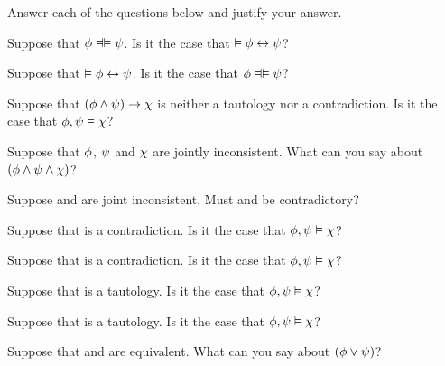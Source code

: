 \problempart
Answer each of the questions below and justify your answer.
\begin{earg}

\item Suppose that $\meta{\phi} \lequiv \meta{\psi}$.  Is it the case that $\vDash \mathcal{\phi} \leftrightarrow \mathcal{\psi}$?
\item Suppose that $\vDash \mathcal{\phi} \leftrightarrow \mathcal{\psi}$.  Is it the case that $\meta{\phi} \lequiv \meta{\psi}$?

\item Suppose that $(\mathcal{\phi}\wedge\mathcal{\psi})\rightarrow\mathcal{\chi}$ is neither a tautology nor a contradiction. Is it the case that $\mathcal{\phi}, \mathcal{\psi} \vDash\mathcal{\chi}$?
\item Suppose that $\mathcal{\phi}$, $\mathcal{\psi}$ and $\mathcal{\chi}$  are jointly inconsistent. What can you say about $(\mathcal{\phi}\wedge\mathcal{\psi}\wedge\mathcal{\chi})$?
\item Suppose \meta{\phi} and \meta{\psi} are joint inconsistent.  Must \meta{\phi} and \meta{\psi} be contradictory?
\item Suppose that \meta{\phi} is a contradiction. Is it the case that $\mathcal{\phi}, \mathcal{\psi} \vDash \mathcal{\chi}$?
\item Suppose that \meta{\chi} is a contradiction. Is it the case that $\mathcal{\phi}, \mathcal{\psi} \vDash \mathcal{\chi}$?
\item Suppose that \meta{\chi} is a tautology. Is it the case that  $\mathcal{\phi}, \mathcal{\psi}\vDash \mathcal{\chi}$?
\item Suppose that \meta{\phi} is a tautology. Is it the case that  $\mathcal{\phi}, \mathcal{\psi}\vDash \mathcal{\chi}$?
\item Suppose that \meta{\phi} and \meta{\psi} are equivalent. What can you say about $(\mathcal{\phi}\vee\mathcal{\psi})$?

\end{earg}
